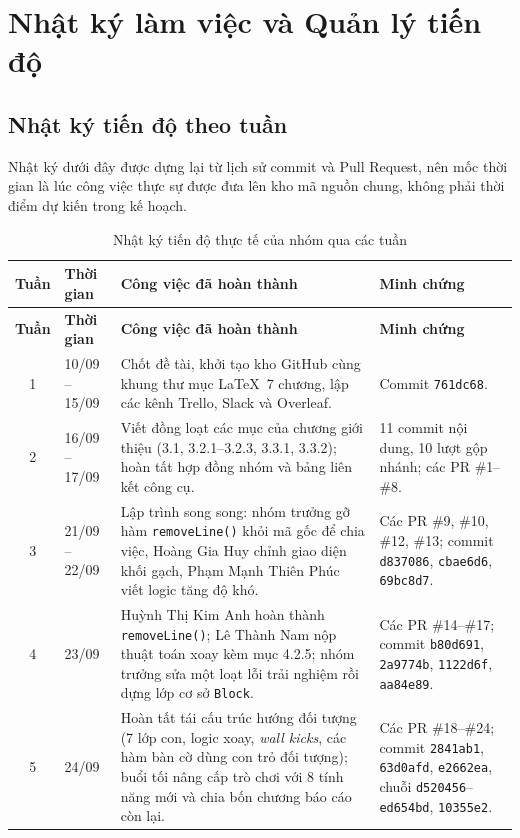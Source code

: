 \section{Nhật ký làm việc và Quản lý tiến độ}

\subsection{Nhật ký tiến độ theo tuần}

Nhật ký dưới đây được dựng lại từ lịch sử commit và Pull Request, nên mốc thời gian là lúc công việc thực sự được đưa lên kho mã nguồn chung, không phải thời điểm dự kiến trong kế hoạch.

\begin{longtable}{|c|p{2.3cm}|p{7.6cm}|p{5.5cm}|}
    \caption{Nhật ký tiến độ thực tế của nhóm qua các tuần}
    \label{tab:nhat_ky_tuan} \\
    \hline
    \textbf{Tuần} & \textbf{Thời gian} & \textbf{Công việc đã hoàn thành} & \textbf{Minh chứng} \\
    \hline
    \endfirsthead
    \hline
    \textbf{Tuần} & \textbf{Thời gian} & \textbf{Công việc đã hoàn thành} & \textbf{Minh chứng} \\
    \hline
    \endhead
    1 & 10/09 -- 15/09 & Chốt đề tài, khởi tạo kho GitHub cùng khung thư mục \LaTeX\ 7 chương, lập các kênh Trello, Slack và Overleaf. & Commit \texttt{761dc68}. \\
    \hline
    2 & 16/09 -- 17/09 & Viết đồng loạt các mục của chương giới thiệu (3.1, 3.2.1--3.2.3, 3.3.1, 3.3.2); hoàn tất hợp đồng nhóm và bảng liên kết công cụ. & 11 commit nội dung, 10 lượt gộp nhánh; các PR \#1--\#8. \\
    \hline
    3 & 21/09 -- 22/09 & Lập trình song song: nhóm trưởng gỡ hàm \texttt{removeLine()} khỏi mã gốc để chia việc, Hoàng Gia Huy chỉnh giao diện khối gạch, Phạm Mạnh Thiên Phúc viết logic tăng độ khó. & Các PR \#9, \#10, \#12, \#13; commit \texttt{d837086}, \texttt{cbae6d6}, \texttt{69bc8d7}. \\
    \hline
    4 & 23/09 & Huỳnh Thị Kim Anh hoàn thành \texttt{removeLine()}; Lê Thành Nam nộp thuật toán xoay kèm mục 4.2.5; nhóm trưởng sửa một loạt lỗi trải nghiệm rồi dựng lớp cơ sở \texttt{Block}. & Các PR \#14--\#17; commit \texttt{b80d691}, \texttt{2a9774b}, \texttt{1122d6f}, \texttt{aa84e89}. \\
    \hline
    5 & 24/09 & Hoàn tất tái cấu trúc hướng đối tượng (7 lớp con, logic xoay, \textit{wall kicks}, các hàm bàn cờ dùng con trỏ đối tượng); buổi tối nâng cấp trò chơi với 8 tính năng mới và chia bốn chương báo cáo còn lại. & Các PR \#18--\#24; commit \texttt{2841ab1}, \texttt{63d0afd}, \texttt{e2662ea}, chuỗi \texttt{d520456}--\texttt{ed654bd}, \texttt{10355e2}. \\
    \hline
\end{longtable}

